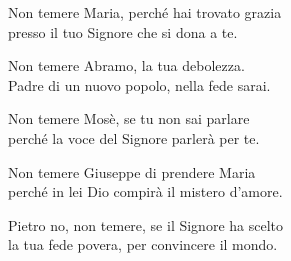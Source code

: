 
\strofa Non temere Maria, perché hai trovato grazia\\
presso il tuo Signore che si dona a te.

\spazio


\spazio

\strofa Non temere Abramo, la tua debolezza.\\
Padre di un nuovo popolo, nella fede sarai.

\spazio


\spazio

\strofa Non temere Mosè, se tu non sai parlare\\
perché la voce del Signore parlerà per te.

\spazio


\spazio

\strofa Non temere Giuseppe di prendere Maria\\
perché in lei Dio compirà il mistero d'amore.

\spazio


\spazio

\strofa Pietro no, non temere, se il Signore ha scelto\\
la tua fede povera, per convincere il mondo.

\spazio

